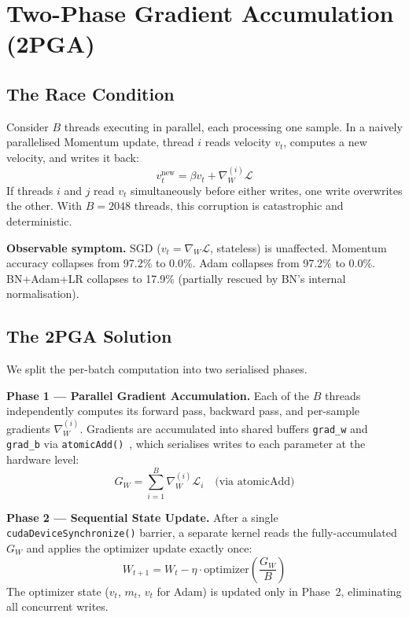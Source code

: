 \documentclass[runningheads]{llncs}
\begin{document}
\section{Two-Phase Gradient Accumulation (2PGA)}

\subsection{The Race Condition}

Consider $B$ threads executing in parallel, each processing one sample. In
a naively parallelised Momentum update, thread $i$ reads velocity $v_t$,
computes a new velocity, and writes it back:
\begin{equation}
  v_t^{\text{new}} = \beta v_t + \nabla_W^{(i)} \mathcal{L}
\end{equation}
If threads $i$ and $j$ read $v_t$ simultaneously before either writes, one
write overwrites the other. With $B=2048$ threads, this corruption is
catastrophic and deterministic.

\textbf{Observable symptom.} SGD ($v_t = \nabla_W \mathcal{L}$, stateless)
is unaffected. Momentum accuracy collapses from 97.2\% to 0.0\%. Adam
collapses from 97.2\% to 0.0\%. BN+Adam+LR collapses to 17.9\%
(partially rescued by BN's internal normalisation).

\subsection{The 2PGA Solution}

We split the per-batch computation into two serialised phases.

\textbf{Phase 1 — Parallel Gradient Accumulation.} Each of the $B$ threads
independently computes its forward pass, backward pass, and per-sample
gradients $\nabla_W^{(i)}$. Gradients are accumulated into shared buffers
\texttt{grad\_w} and \texttt{grad\_b} via \texttt{atomicAdd()}~\cite{b18},
which serialises writes to each parameter at the hardware level:
\begin{equation}
  G_W = \sum_{i=1}^{B} \nabla_W^{(i)} \mathcal{L}_i
  \quad \text{(via atomicAdd)}
\end{equation}

\textbf{Phase 2 — Sequential State Update.} After a single
\mbox{\texttt{cudaDeviceSynchronize()}} barrier, a separate kernel reads the
fully-accumulated $G_W$ and applies the optimizer update exactly once:
\begin{equation}
  W_{t+1} = W_t - \eta \cdot \text{optimizer}\!\left(\frac{G_W}{B}\right)
\end{equation}
The optimizer state ($v_t$, $m_t$, $v_t$ for Adam) is updated only in
Phase~2, eliminating all concurrent writes.
\end{document}
